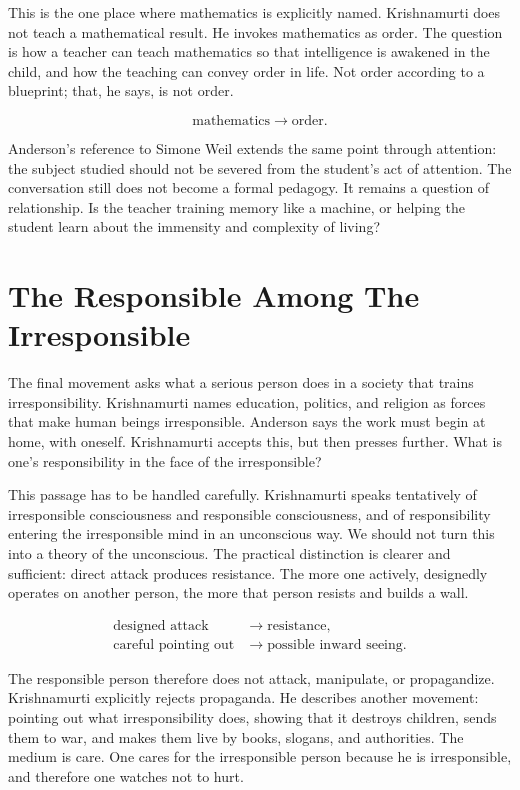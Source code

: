 This is the one place where mathematics is explicitly named. Krishnamurti does not teach a mathematical result. He invokes mathematics as order. The question is how a teacher can teach mathematics so that intelligence is awakened in the child, and how the teaching can convey order in life. Not order according to a blueprint; that, he says, is not order.

\begin{equation}
\text{mathematics}
\longrightarrow
\text{order}.
\end{equation}

Anderson's reference to Simone Weil extends the same point through attention: the subject studied should not be severed from the student's act of attention. The conversation still does not become a formal pedagogy. It remains a question of relationship. Is the teacher training memory like a machine, or helping the student learn about the immensity and complexity of living?

\section{The Responsible Among The Irresponsible}

The final movement asks what a serious person does in a society that trains irresponsibility. Krishnamurti names education, politics, and religion as forces that make human beings irresponsible. Anderson says the work must begin at home, with oneself. Krishnamurti accepts this, but then presses further. What is one's responsibility in the face of the irresponsible?

This passage has to be handled carefully. Krishnamurti speaks tentatively of irresponsible consciousness and responsible consciousness, and of responsibility entering the irresponsible mind in an unconscious way. We should not turn this into a theory of the unconscious. The practical distinction is clearer and sufficient: direct attack produces resistance. The more one actively, designedly operates on another person, the more that person resists and builds a wall.

\begin{align}
\text{designed attack}
&\longrightarrow \text{resistance}, \\
\text{careful pointing out}
&\longrightarrow \text{possible inward seeing}.
\end{align}

The responsible person therefore does not attack, manipulate, or propagandize. Krishnamurti explicitly rejects propaganda. He describes another movement: pointing out what irresponsibility does, showing that it destroys children, sends them to war, and makes them live by books, slogans, and authorities. The medium is care. One cares for the irresponsible person because he is irresponsible, and therefore one watches not to hurt.

